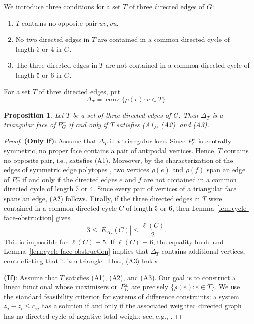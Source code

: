 \documentclass[11pt,a4paper]{amsart}
\newtheorem{proposition}[theorem]{Proposition}
\theoremstyle{definition}
\theoremstyle{remark}
\newcommand{\conv}{\operatorname{conv}}
\begin{document}
{We introduce three conditions for a set $T$ of three directed edges of $G$:
\begin{enumerate}[label=\textup{(A\arabic*)}]
\item $T$ contains no opposite pair $uv,vu$.
\item No two directed edges in $T$ are contained in a common directed cycle of length $3$ or $4$ in $G$.
\item The three directed edges in $T$ are not contained in a common directed cycle of length $5$ or $6$ in $G$. 
\end{enumerate}
For a set $T$ of three directed edges, put \[  \Delta_T=\conv\{\rho(e):e\in T\}.\]

\begin{proposition}\label{prop:triangles}
Let $T$ be a set of three directed edges of $G$.  Then $\Delta_T$ is a triangular face of $P_G^{\pm}$ 
if and only if $T$ satisfies \textup{(A1)}, \textup{(A2)}, and \textup{(A3)}. 
\end{proposition}
\begin{proof}
{\bf (Only if)}: Assume that $\Delta_T$ is a triangular face. 
Since $P_G^{\pm}$ is centrally symmetric, no proper face contains a pair of antipodal vertices. Hence, $T$ contains no opposite pair, i.e., satisfies (A1). 
Moreover, by the characterization of the edges of symmetric edge polytopes \cite[Lemma~3.2]{CRV}, 
two vertices $\rho(e)$ and $\rho(f)$ span an edge of $P_G^{\pm}$ if and only if the directed edges $e$ and $f$ are not contained in a common directed cycle of length $3$ or $4$. 
Since every pair of vertices of a triangular face spans an edge, (A2) follows. 
Finally, if the three directed edges in $T$ were contained in a common directed cycle $C$ of length $5$ or $6$, 
then Lemma~\ref{lem:cycle-face-obstruction} gives \[3\le |E_{\Delta_T}(C)|\le \frac{\ell(C)}{2}.\]
This is impossible for $\ell(C)=5$. If $\ell(C)=6$, the equality holds and Lemma~\ref{lem:cycle-face-obstruction} implies that 
$\Delta_T$ contains additional vertices, contradicting that it is a triangle. Thus, (A3) holds. 

\bigskip

\noindent
{\bf (If)}: Assume that $T$ satisfies (A1), (A2), and (A3). Our goal is to construct a linear functional whose maximizers on $P_G^{\pm}$ are precisely $\{\rho(e):e\in T\}$. 
We use the standard feasibility criterion for systems of difference constraints: a system $z_j-z_i\le c_{ij}$ has a solution if and only if 
the associated weighted directed graph has no directed cycle of negative total weight; see, e.g., \cite[Theorem~24.9]{CLRS}. 


\end{proof}}
\end{document}

